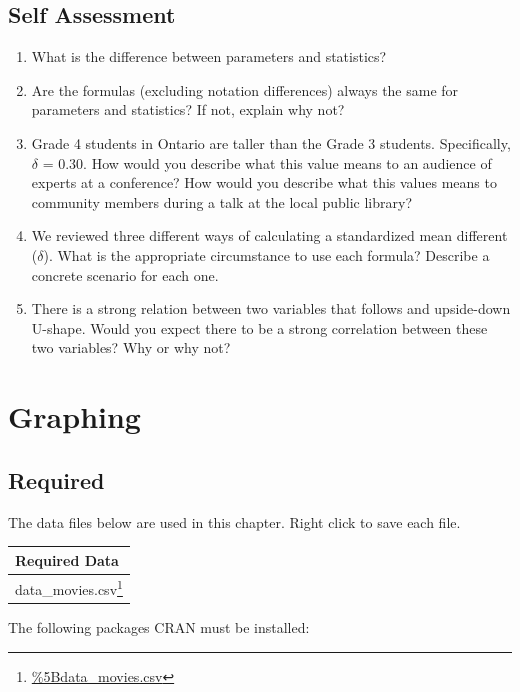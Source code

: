 \documentclass[
]{krantz}
\renewcommand{\href}[2]{#2\footnote{\url{#1}}}
\begin{document}
\hypertarget{self-assessment}{%
\section{Self Assessment}\label{self-assessment}}

\begin{enumerate}
\def\labelenumi{\arabic{enumi}.}
\item
  What is the difference between parameters and statistics?
\item
  Are the formulas (excluding notation differences) always the same for parameters and statistics? If not, explain why not?
\item
  Grade 4 students in Ontario are taller than the Grade 3 students. Specifically, \(\delta\) = 0.30. How would you describe what this value means to an audience of experts at a conference? How would you describe what this values means to community members during a talk at the local public library?
\item
  We reviewed three different ways of calculating a standardized mean different (\(\delta\)). What is the appropriate circumstance to use each formula? Describe a concrete scenario for each one.
\item
  There is a strong relation between two variables that follows and upside-down U-shape. Would you expect there to be a strong correlation between these two variables? Why or why not?
\end{enumerate}

\hypertarget{graphing}{%
\chapter{Graphing}\label{graphing}}

\hypertarget{required-1}{%
\section{Required}\label{required-1}}

The data files below are used in this chapter. Right click to save each file.

\begin{longtable}[]{@{}l@{}}
\toprule
Required Data \\
\midrule
\endhead
\href{\%5Bdata_movies.csv}{data\_movies.csv} \\
\bottomrule
\end{longtable}

The following packages CRAN must be installed:
\end{document}

